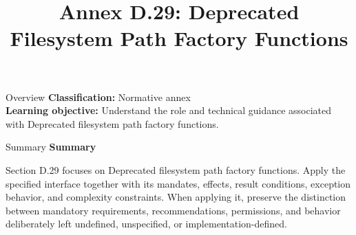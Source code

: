 \documentclass[10pt,letterpaper]{article}
\title{Annex D.29: Deprecated Filesystem Path Factory Functions}
\author{}
\date{}
\begin{document}
\maketitle
\begin{CornellOverviewBox}{Overview}
\textbf{Classification:} Normative annex\\[2pt]
\textbf{Learning objective:} Understand the role and technical guidance associated with Deprecated filesystem path factory functions.
\end{CornellOverviewBox}\begin{CornellSummaryBox}{Summary}
{\sffamily\bfseries\color{Accent} Summary}\par\vspace{3pt}Section D.29 focuses on Deprecated filesystem path factory functions. Apply the specified interface together with its mandates, effects, result conditions, exception behavior, and complexity constraints. When applying it, preserve the distinction between mandatory requirements, recommendations, permissions, and behavior deliberately left undefined, unspecified, or implementation-defined.
\end{CornellSummaryBox}
\end{document}
